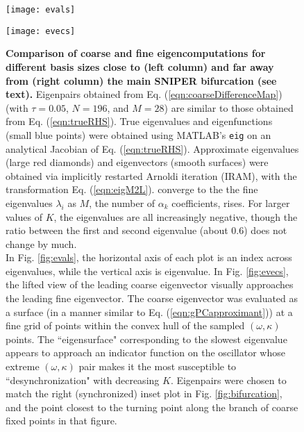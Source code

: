 \documentclass[numbers]{frontiersSCNS}
\newcommand{\degree}{\kappa}
\newcommand{\couplingK}{{K}}
\newcommand{\numCofs}{{M}}
\newcommand{\figRef}[1]{Fig. \ref{fig:#1}}
\newcommand{\eqnRef}[1]{Eq. (\ref{eqn:#1})}
\newcommand{\scalarFuncIndex}{k}
\DeclareRobustCommand{\inTstep}{\tau}
\newcommand{\flowTimeVal}{0.05}
\newcommand{\eigcompsNval}{196}
\newcommand{\eigcompsMval}{28}
\begin{document}
\setcounter{subfigure}{0}\begin{figure}[ht]
\centering
%
\begin{minipage}[b]{.45\linewidth}
    \centering
    \texttt{[image: evals]}\subcaption{}\label{fig:evals}
\end{minipage}
\begin{minipage}[b]{.45\linewidth}
    \centering
    \texttt{[image: evecs]}\subcaption{}\label{fig:evecs}
\end{minipage}
\caption{
    \textbf{
    Comparison of coarse and fine eigencomputations for
    different basis sizes close to (left column) and
    far away from (right column) the main SNIPER bifurcation (see text).
    }
%
    Eigenpairs obtained
    from \eqnRef{coarseDifferenceMap}
    (with ${\inTstep} = \flowTimeVal$,
    $N = \eigcompsNval$,
    and $\numCofs = \eigcompsMval$)
    are similar to those obtained from \eqnRef{trueRHS}.
    True eigenvalues and eigenfunctions (small blue points) were obtained using MATLAB's \texttt{eig}
    on an analytical Jacobian of \eqnRef{trueRHS}.
    Approximate eigenvalues (large red diamonds) and eigenvectors (smooth surfaces)
    were obtained via implicitly restarted Arnoldi iteration (IRAM),
    with the transformation \eqnRef{eigM2L}.
%
    converge to the the fine eigenvalues $\lambda_i$
    as $M$, the number of $\alpha_{\scalarFuncIndex}$ coefficients, rises.
    For larger values of $\couplingK$,
    the eigenvalues are all increasingly negative,
    though the ratio between the first and second eigenvalue (about $0.6$)
    does not change by much.
    \\
    In \figRef{evals}, the horizontal axis of each plot is an index across eigenvalues,
    while the vertical axis is eigenvalue.
    In \figRef{evecs}, the lifted view of the leading coarse eigenvector visually
    approaches the leading fine eigenvector.
    The coarse eigenvector was evaluated as a surface
    (in a manner similar to \eqnRef{gPCapproximant})
    at a fine grid of points within the convex hull of the sampled $(\omega, \degree)$ points.
    The ``eigensurface" corresponding to the slowest eigenvalue appears to approach an indicator function on the oscillator
    whose extreme $(\omega,\degree)$ pair makes it the most susceptible to ``desynchronization"
    with decreasing $K$.
    Eigenpairs were chosen to match the right (synchronized) inset plot in \figRef{bifurcation},
    and the point closest to the turning point
    along the branch of coarse fixed points in that figure.
}
\label{fig:eigeninformation}
\end{figure}
%
\end{document}
